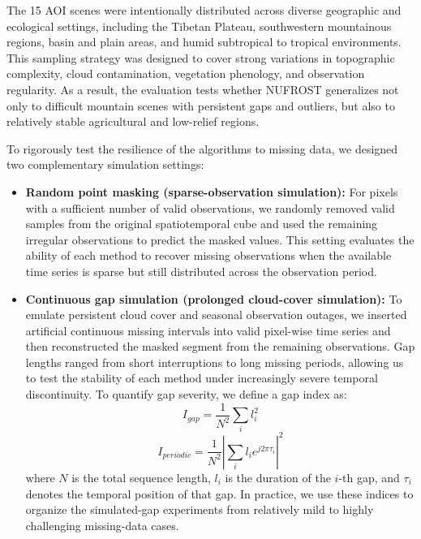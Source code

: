 \documentclass[letterpaper,journal]{IEEEtran}
\begin{document}
The 15 AOI scenes were intentionally distributed across diverse geographic and ecological settings, including the Tibetan Plateau, southwestern mountainous regions, basin and plain areas, and humid subtropical to tropical environments. This sampling strategy was designed to cover strong variations in topographic complexity, cloud contamination, vegetation phenology, and observation regularity. As a result, the evaluation tests whether NUFROST generalizes not only to difficult mountain scenes with persistent gaps and outliers, but also to relatively stable agricultural and low-relief regions.

To rigorously test the resilience of the algorithms to missing data, we designed two complementary simulation settings:
\begin{itemize}
    \item \textbf{Random point masking (sparse-observation simulation):} For pixels with a sufficient number of valid observations, we randomly removed valid samples from the original spatiotemporal cube and used the remaining irregular observations to predict the masked values. This setting evaluates the ability of each method to recover missing observations when the available time series is sparse but still distributed across the observation period.
    \item \textbf{Continuous gap simulation (prolonged cloud-cover simulation):} To emulate persistent cloud cover and seasonal observation outages, we inserted artificial continuous missing intervals into valid pixel-wise time series and then reconstructed the masked segment from the remaining observations. Gap lengths ranged from short interruptions to long missing periods, allowing us to test the stability of each method under increasingly severe temporal discontinuity. To quantify gap severity, we define a gap index as:
    \begin{equation}
    \label{eq:gap_index}
    I_{gap}=\frac{1}{N^2}\sum_i{l_i^2}
    \end{equation}
    \begin{equation}
    \label{eq:gap_index_periodic}
    I_{periodic} = \frac{1}{N^2}\left|\sum_i l_i e^{j2\pi\tau_i}\right|^2
    \end{equation}
    where $N$ is the total sequence length, $l_i$ is the duration of the $i$-th gap, and $\tau_i$ denotes the temporal position of that gap. In practice, we use these indices to organize the simulated-gap experiments from relatively mild to highly challenging missing-data cases.
\end{itemize}
\end{document}
